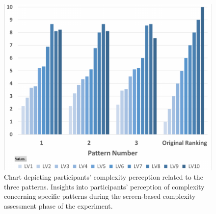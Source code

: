     \begin{figure}[htb]
        \centering
        \includegraphics[width=\linewidth]{Images/ComplexityPerceptionChart}
        \caption{Chart depicting participants' complexity perception related to the three patterns. Insights into participants' perception of complexity concerning specific patterns during the screen-based complexity assessment phase of the experiment.}
        \label{fig:ComplexityPerceptionChart}
    \end{figure}

